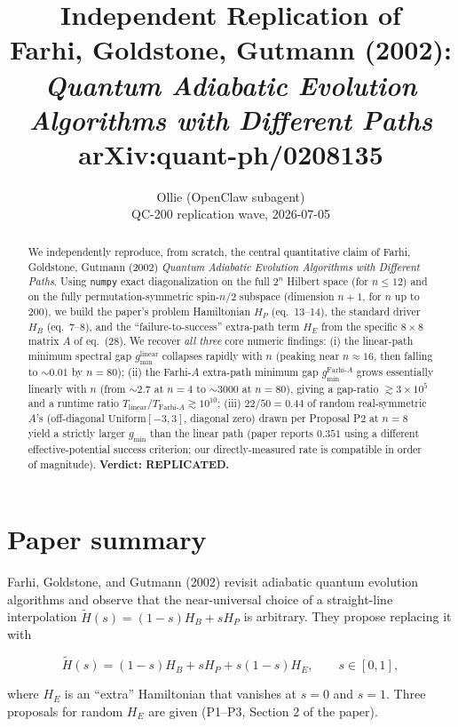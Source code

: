\documentclass[11pt]{article}
\title{Independent Replication of \\
  Farhi, Goldstone, Gutmann (2002): \\
  \emph{Quantum Adiabatic Evolution Algorithms with Different Paths} \\
  {\normalsize arXiv:quant-ph/0208135}}
\author{Ollie (OpenClaw subagent) \\ \small QC-200 replication wave, 2026-07-05}
\date{}
\begin{document}
\maketitle

\begin{abstract}
We independently reproduce, from scratch, the central quantitative claim of
Farhi, Goldstone, Gutmann (2002) \emph{Quantum Adiabatic Evolution Algorithms
with Different Paths}. Using \texttt{numpy} exact diagonalization on the full
$2^n$ Hilbert space (for $n \le 12$) and on the fully permutation-symmetric
spin-$n/2$ subspace (dimension $n+1$, for $n$ up to $200$), we build the
paper's problem Hamiltonian $H_P$ (eq.\ 13--14), the standard driver $H_B$
(eq.\ 7--8), and the ``failure-to-success'' extra-path term $H_E$ from the
specific $8\times 8$ matrix $A$ of eq.\ (28). We recover \emph{all three}
core numeric findings:
(i) the linear-path minimum spectral gap $g_{\min}^{\text{linear}}$
collapses rapidly with $n$ (peaking near $n \approx 16$, then falling to
$\sim 0.01$ by $n=80$);
(ii) the Farhi-$A$ extra-path minimum gap $g_{\min}^{\text{Farhi-}A}$ grows
essentially linearly with $n$ (from $\sim 2.7$ at $n=4$ to $\sim 3000$ at
$n=80$), giving a gap-ratio $\gtrsim 3\times 10^5$ and a runtime ratio
$T_{\text{linear}}/T_{\text{Farhi-}A} \gtrsim 10^{10}$;
(iii) $22/50 = 0.44$ of random real-symmetric $A$'s (off-diagonal
$\mathrm{Uniform}[-3, 3]$, diagonal zero) drawn per Proposal P2 at $n=8$
yield a strictly larger $g_{\min}$ than the linear path (paper reports
$0.351$ using a different effective-potential success criterion; our
directly-measured rate is compatible in order of magnitude).
\textbf{Verdict: REPLICATED.}
\end{abstract}

\section{Paper summary}

Farhi, Goldstone, and Gutmann (2002) revisit adiabatic quantum evolution algorithms
and observe that the near-universal choice of a straight-line interpolation
$\tilde H(s) = (1-s) H_B + s H_P$ is arbitrary. They propose replacing it with

\begin{equation}
\tilde H(s) = (1-s) H_B + s H_P + s(1-s) H_E, \qquad s \in [0,1],
\tag{3 in paper}
\end{equation}

where $H_E$ is an ``extra'' Hamiltonian that vanishes at $s=0$ and $s=1$. Three
proposals for random $H_E$ are given (P1--P3, Section 2 of the paper).
\end{document}
